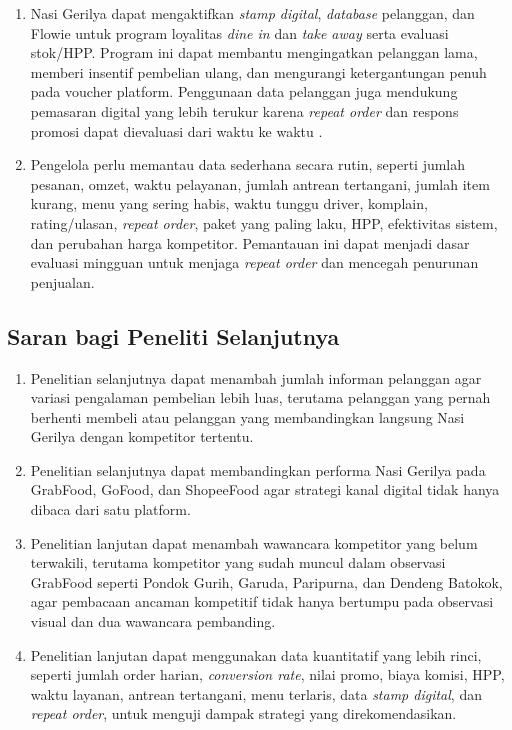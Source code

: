 \begin{enumerate}
    \item Nasi Gerilya dapat mengaktifkan \textit{stamp digital}, \textit{database} pelanggan, dan Flowie untuk program loyalitas \textit{dine in} dan \textit{take away} serta evaluasi stok/HPP. Program ini dapat membantu mengingatkan pelanggan lama, memberi insentif pembelian ulang, dan mengurangi ketergantungan penuh pada voucher platform. Penggunaan data pelanggan juga mendukung pemasaran digital yang lebih terukur karena \textit{repeat order} dan respons promosi dapat dievaluasi dari waktu ke waktu \parencite{chaffey2022digitalmarketing,kotler2021marketingmanagement}.

    \item Pengelola perlu memantau data sederhana secara rutin, seperti jumlah pesanan, omzet, waktu pelayanan, jumlah antrean tertangani, jumlah item kurang, menu yang sering habis, waktu tunggu driver, komplain, rating/ulasan, \textit{repeat order}, paket yang paling laku, HPP, efektivitas sistem, dan perubahan harga kompetitor. Pemantauan ini dapat menjadi dasar evaluasi mingguan untuk menjaga \textit{repeat order} dan mencegah penurunan penjualan.
\end{enumerate}

\subsection{Saran bagi Peneliti Selanjutnya}
\begin{enumerate}
    \item Penelitian selanjutnya dapat menambah jumlah informan pelanggan agar variasi pengalaman pembelian lebih luas, terutama pelanggan yang pernah berhenti membeli atau pelanggan yang membandingkan langsung Nasi Gerilya dengan kompetitor tertentu.

    \item Penelitian selanjutnya dapat membandingkan performa Nasi Gerilya pada GrabFood, GoFood, dan ShopeeFood agar strategi kanal digital tidak hanya dibaca dari satu platform.

    \item Penelitian lanjutan dapat menambah wawancara kompetitor yang belum terwakili, terutama kompetitor yang sudah muncul dalam observasi GrabFood seperti Pondok Gurih, Garuda, Paripurna, dan Dendeng Batokok, agar pembacaan ancaman kompetitif tidak hanya bertumpu pada observasi visual dan dua wawancara pembanding.

    \item Penelitian lanjutan dapat menggunakan data kuantitatif yang lebih rinci, seperti jumlah order harian, \textit{conversion rate}, nilai promo, biaya komisi, HPP, waktu layanan, antrean tertangani, menu terlaris, data \textit{stamp digital}, dan \textit{repeat order}, untuk menguji dampak strategi yang direkomendasikan.
\end{enumerate}

